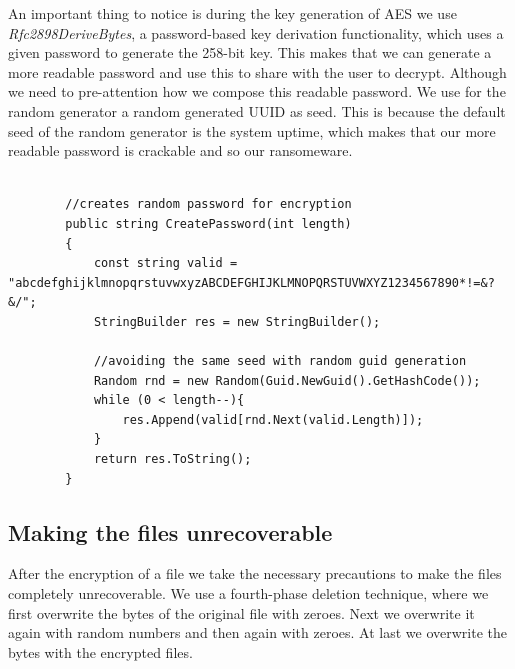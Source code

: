 An important thing to notice is during the key generation of AES we use \textit{Rfc2898DeriveBytes}, a password-based key derivation functionality, which uses a given password to generate the 258-bit key. This makes that we can generate a more readable password and use this to share with the user to decrypt. Although we need to pre-attention how we compose this readable password. We use for the random generator a random generated UUID as seed. This is because the default seed of the random generator is the system uptime, which makes that our more readable password is crackable and so our ransomeware.

\begin{lstlisting}[frame=single, showstringspaces=false] 

        //creates random password for encryption
        public string CreatePassword(int length)
        {
            const string valid = "abcdefghijklmnopqrstuvwxyzABCDEFGHIJKLMNOPQRSTUVWXYZ1234567890*!=&?&/";
            StringBuilder res = new StringBuilder();
            
            //avoiding the same seed with random guid generation
            Random rnd = new Random(Guid.NewGuid().GetHashCode());
            while (0 < length--){
                res.Append(valid[rnd.Next(valid.Length)]);
            }
            return res.ToString();
        }

\end{lstlisting}

\subsection{Making the files unrecoverable}

After the encryption of a file we take the necessary precautions to make the files completely unrecoverable. We use a fourth-phase deletion technique, where we first overwrite the bytes of the original file with zeroes. Next we overwrite it again with random numbers and then again with zeroes. At last we overwrite the bytes with the encrypted files. 

